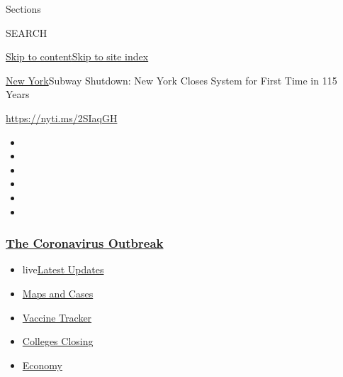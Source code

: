 Sections

SEARCH

\protect\hyperlink{site-content}{Skip to
content}\protect\hyperlink{site-index}{Skip to site index}

\href{/section/nyregion}{New York}\textbar{}Subway Shutdown: New York
Closes System for First Time in 115 Years

\url{https://nyti.ms/2SIaqGH}

\begin{itemize}
\item
\item
\item
\item
\item
\item
\end{itemize}

\hypertarget{the-coronavirus-outbreak}{%
\subsubsection{\texorpdfstring{\href{https://www.nytimes3xbfgragh.onion/news-event/coronavirus?name=styln-coronavirus-national\&region=TOP_BANNER\&variant=undefined\&block=storyline_menu_recirc\&action=click\&pgtype=Article\&impression_id=6dfa89b0-e3ab-11ea-b9dd-61427990e3d0}{The
Coronavirus
Outbreak}}{The Coronavirus Outbreak}}\label{the-coronavirus-outbreak}}

\begin{itemize}
\tightlist
\item
  live\href{https://www.nytimes3xbfgragh.onion/2020/08/21/world/covid-19-coronavirus.html?name=styln-coronavirus-national\&region=TOP_BANNER\&variant=undefined\&block=storyline_menu_recirc\&action=click\&pgtype=Article\&impression_id=6dfa89b1-e3ab-11ea-b9dd-61427990e3d0}{Latest
  Updates}
\item
  \href{https://www.nytimes3xbfgragh.onion/interactive/2020/us/coronavirus-us-cases.html?name=styln-coronavirus-national\&region=TOP_BANNER\&variant=undefined\&block=storyline_menu_recirc\&action=click\&pgtype=Article\&impression_id=6dfa89b2-e3ab-11ea-b9dd-61427990e3d0}{Maps
  and Cases}
\item
  \href{https://www.nytimes3xbfgragh.onion/interactive/2020/science/coronavirus-vaccine-tracker.html?name=styln-coronavirus-national\&region=TOP_BANNER\&variant=undefined\&block=storyline_menu_recirc\&action=click\&pgtype=Article\&impression_id=6dfa89b3-e3ab-11ea-b9dd-61427990e3d0}{Vaccine
  Tracker}
\item
  \href{https://www.nytimes3xbfgragh.onion/2020/08/19/us/colleges-closing-covid.html?name=styln-coronavirus-national\&region=TOP_BANNER\&variant=undefined\&block=storyline_menu_recirc\&action=click\&pgtype=Article\&impression_id=6dfab0c0-e3ab-11ea-b9dd-61427990e3d0}{Colleges
  Closing}
\item
  \href{https://www.nytimes3xbfgragh.onion/live/2020/08/21/business/stock-market-today-coronavirus?name=styln-coronavirus-national\&region=TOP_BANNER\&variant=undefined\&block=storyline_menu_recirc\&action=click\&pgtype=Article\&impression_id=6dfab0c1-e3ab-11ea-b9dd-61427990e3d0}{Economy}
\end{itemize}

